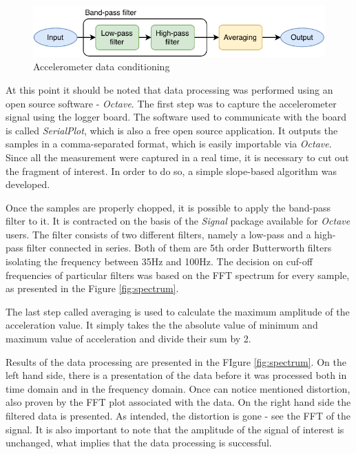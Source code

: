 \documentclass[12pt,a4paper]{article}
\begin{document}
\begin{figure}[ht!]
\includegraphics[scale=1.0]{accelsignal.pdf}
\caption{Accelerometer data conditioning}
\label{fig:accelsignal}
\end{figure}



At this point it should be noted that data processing was performed using an open source software - \textit{Octave}. The first step was to capture the accelerometer signal using the logger board. The software used to communicate with the board is called \textit{SerialPlot}, which is also a free open source application. It outputs the samples in a comma-separated format, which is easily importable via \textit{Octave}. Since all the measurement were captured in a real time, it is necessary to cut out the fragment of interest. In order to do so, a simple slope-based algorithm was developed.
\par
Once the samples are properly chopped, it is possible to apply the band-pass filter to it. It is contracted on the basis of the \textit{Signal} package available for \textit{Octave} users. The filter consists of two different filters, namely a low-pass and a high-pass filter connected in series. Both of them are 5th order Butterworth filters isolating the frequency between 35Hz and 100Hz. The decision on cuf-off frequencies of particular filters was based on the FFT spectrum for every sample, as presented in the Figure \ref{fig:spectrum}.
\par
The last step called averaging is used to calculate the maximum amplitude of the acceleration value. It simply takes the the absolute value of minimum and maximum value of acceleration and divide their sum by 2.\par
Results of the data processing are presented in the FIgure \ref{fig:spectrum}. On the left hand side, there is a presentation of the data before it was processed both in time domain and in the frequency domain. Once can notice mentioned distortion, also proven by the FFT plot associated with the data. On the right hand side the filtered data is presented. As intended, the distortion is gone - see the FFT of the signal. It is also important to note that the amplitude of the signal of interest is unchanged, what implies that the data processing is successful.
\end{document}
